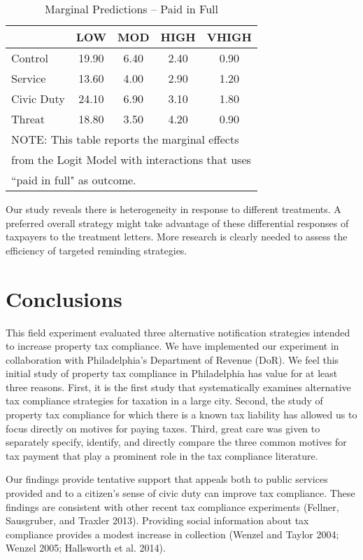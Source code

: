 \documentclass[12pt,titlepage]{article}
\begin{document}
\begin{table}[htbp]
\caption{Marginal Predictions -- Paid in Full}  \label{TT}
\bigskip
\begin{center}
\begin{tabular}{| l | c | c | c | c |}
  \hline
 & LOW & MOD & HIGH & VHIGH \\ 
  \hline
Control & 19.90 & 6.40 & 2.40 & 0.90 \\ 
  Service & 13.60 & 4.00 & 2.90 & 1.20 \\ 
  Civic Duty & 24.10 & 6.90 & 3.10 & 1.80 \\ 
  Threat & 18.80 & 3.50 & 4.20 & 0.90 \\ 
   \hline
\multicolumn{5}{l}{NOTE: This table reports the marginal effects} \\
\multicolumn{5}{l}{from the Logit Model with interactions that uses} \\
\multicolumn{5}{l}{``paid in full" as outcome.} \\
\end{tabular}
\end{center}
\end{table}

Our study reveals there is heterogeneity in response to different
treatments.  A preferred overall strategy might take advantage of
these differential responses of taxpayers to the treatment
letters. More research is clearly needed to assess the efficiency of
targeted reminding strategies.


\section{Conclusions}

This field experiment evaluated three alternative notification
strategies intended to increase property tax compliance.  We have
implemented our experiment in collaboration with Philadelphia's
Department of Revenue (DoR).  We feel this initial study of property
tax compliance in Philadelphia has value for at least three reasons.
First, it is the first study that systematically examines alternative
tax compliance strategies for taxation in a large city.  Second, the
study of property tax compliance for which there is a known tax
liability has allowed us to focus directly on motives for paying
taxes.  Third, great care was given to separately specify, identify,
and directly compare the three common motives for tax payment that
play a prominent role in the tax compliance literature.

Our findings provide tentative support that appeals both to public
services provided and to a citizen's sense of civic duty can improve
tax compliance. These findings are consistent with other recent tax compliance
experiments (Fellner, Sausgruber, and Traxler 2013). Providing social information about
tax compliance provides a modest increase in collection (Wenzel and
Taylor 2004; Wenzel 2005; Hallsworth et al. 2014).
\end{document}
